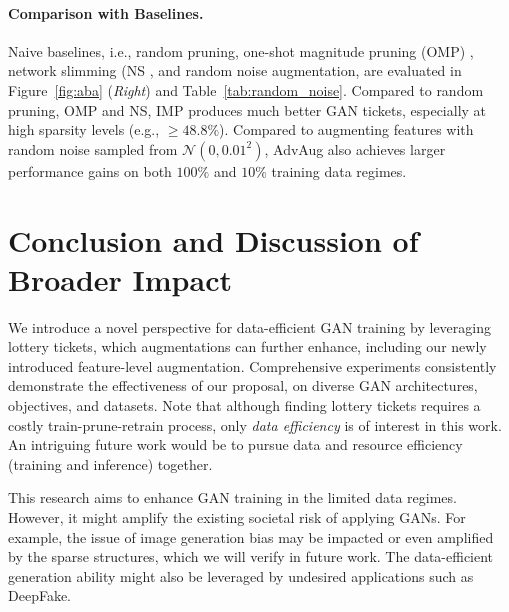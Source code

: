 \documentclass{article}
\begin{document}
\vspace{-0.1em}
\paragraph{Comparison with Baselines.} Naive baselines, i.e., random pruning, one-shot magnitude pruning (OMP) \cite{han2015deep,chen2021gans}, network slimming (NS \cite{liu2017learning}, and random noise augmentation, are evaluated in Figure~\ref{fig:aba} (\textit{Right}) and Table~\ref{tab:random_noise}. Compared to random pruning, OMP and NS, IMP produces much better GAN tickets, especially at high sparsity levels (e.g., $\ge 48.8\%$). Compared to augmenting features with random noise sampled from $\mathcal{N}(0,0.01^2)$, AdvAug also achieves larger performance gains on both $100\%$ and $10\%$ training data regimes. 

\vspace{-0.1em}
\section{Conclusion and Discussion of Broader Impact} \label{sec:conclusion}
We introduce a novel perspective for data-efficient GAN training by leveraging lottery tickets, which augmentations can further enhance, including our newly introduced feature-level augmentation. Comprehensive experiments consistently demonstrate the effectiveness of our proposal, on diverse GAN architectures, objectives, and datasets. 
Note that although finding lottery tickets requires a costly train-prune-retrain process, only \emph{data efficiency} is of interest in this work. An intriguing future work would be to pursue data and resource efficiency (training and inference) together.

This research aims to enhance GAN training in the limited data regimes. However, it might amplify the existing societal risk of applying GANs. For example, the issue of image generation bias may be impacted or even amplified by the sparse structures, which we will verify in future work. The data-efficient generation ability might also be leveraged by undesired applications such as DeepFake.





\clearpage

\appendix

\renewcommand{\thepage}{A\arabic{page}}  
\renewcommand{\thesection}{A\arabic{section}}   
\renewcommand{\thetable}{A\arabic{table}}   
\renewcommand{\thefigure}{A\arabic{figure}}
\end{document}
